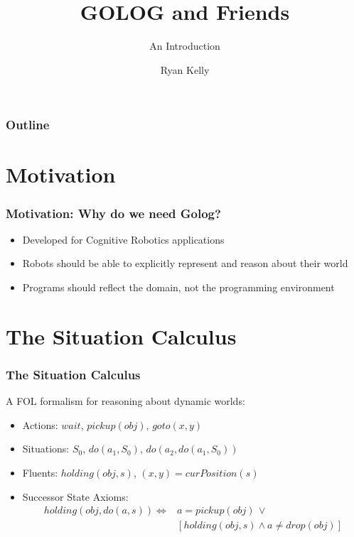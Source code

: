 \documentclass{beamer}
\title{GOLOG and Friends}
\subtitle{An Introduction}
\author{Ryan Kelly}
\begin{document}
\begin{frame}
  \titlepage
\end{frame}

\begin{frame}
  \frametitle{Outline}
  \tableofcontents
\end{frame}

\section{Motivation}

\begin{frame}
\frametitle{Motivation: Why do we need Golog?}

\begin{itemize}
\item Developed for Cognitive Robotics applications
\item Robots should be able to explicitly represent and reason about their world
\item Programs should reflect the domain, not the programming environment
\end{itemize}

\end{frame}


\section{The Situation Calculus}

\begin{frame}
\frametitle{The Situation Calculus}

A FOL formalism for reasoning about dynamic worlds:

\begin{itemize}
\item Actions: $wait$, $pickup(obj)$, $goto(x,y)$
\pause
\item Situations: $S_{0}$, $do(a_{1},S_{0})$, $do(a_{2},do(a_{1},S_{0}))$
\pause
\item Fluents: $holding(obj,s)$, $(x,y)=curPosition(s)$
\pause
\item Successor State Axioms:\[
\begin{array}{cc}
holding(obj,do(a,s))\iff & a=pickup(obj)\,\vee\\
 & \left[holding(obj,s)\wedge a\neq drop(obj)\right]\end{array}\]
\end{itemize}

\end{frame}
\end{document}
